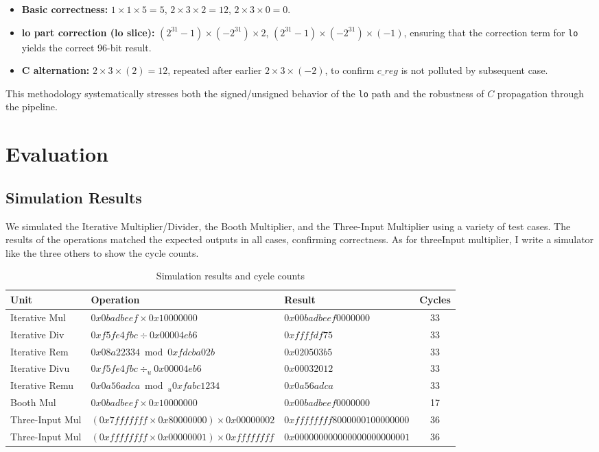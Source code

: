 \documentclass[11pt,a4paper]{article}
\begin{document}
\begin{itemize}
  \item \textbf{Basic correctness:} 
        $1 \times 1 \times 5 = 5$, 
        $2 \times 3 \times 2 = 12$, 
        $2 \times 3 \times 0 = 0$.
  \item \textbf{lo part correction (lo slice):} 
        $(2^{31}-1) \times (-2^{31}) \times 2$, 
        $(2^{31}-1) \times (-2^{31}) \times (-1)$, 
        ensuring that the correction term for \texttt{lo} yields the correct 96-bit result.
  \item \textbf{C alternation:} 
        $2 \times 3 \times (2) = 12$, repeated after earlier $2 \times 3 \times (-2)$, 
        to confirm $c\_reg$ is not polluted by subsequent case.
\end{itemize}

This methodology systematically stresses both the signed/unsigned behavior of the \texttt{lo} path and the robustness of $C$ propagation through the pipeline.



\section{Evaluation}


\subsection{Simulation Results}

We simulated the Iterative Multiplier/Divider, the Booth Multiplier, and the
Three-Input Multiplier using a variety of test cases. The results of the
operations matched the expected outputs in all cases, confirming correctness.
As for threeInput multiplier, I write a simulator like the three others to show the cycle counts.
\begin{table}[H]
\centering
\begin{tabular}{|l|l|l|c|}
\hline
\textbf{Unit} & \textbf{Operation} & \textbf{Result} & \textbf{Cycles} \\
\hline
Iterative Mul  & $0x0badbeef \times 0x10000000$ & $0x00badbeef0000000$ & 33 \\
Iterative Div  & $0xf5fe4fbc \div 0x00004eb6$   & $0xffffdf75$         & 33 \\
Iterative Rem  & $0x08a22334 \bmod 0xfdcba02b$  & $0x020503b5$         & 33 \\
Iterative Divu & $0xf5fe4fbc \div_u 0x00004eb6$ & $0x00032012$         & 33 \\
Iterative Remu & $0x0a56adca \bmod_u 0xfabc1234$& $0x0a56adca$         & 33 \\
\hline
Booth Mul      & $0x0badbeef \times 0x10000000$ & $0x00badbeef0000000$ & 17 \\
\hline
Three-Input Mul& $(0x7fffffff \times 0x80000000) \times 0x00000002$ & $0xffffffff8000000100000000$ & 36 \\
Three-Input Mul& $(0xffffffff \times 0x00000001) \times 0xffffffff$ & $0x000000000000000000000001$ & 36 \\
\hline
\end{tabular}
\caption{Simulation results and cycle counts}
\end{table}
\end{document}
